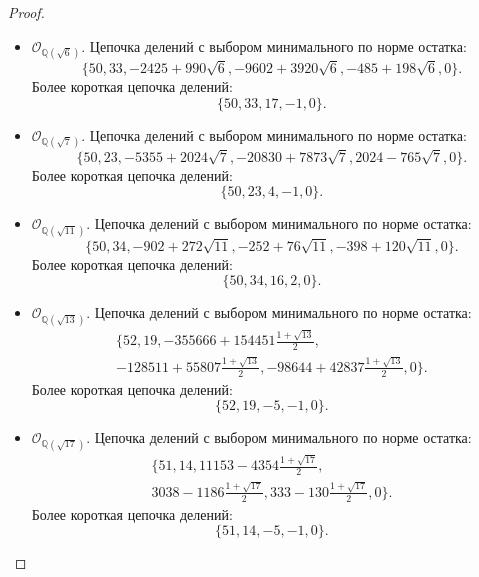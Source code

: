 \documentclass[_00_dissertation.tex]{subfiles}
\begin{document}
\begin{proof}
\begin{itemize}
        \item $\mathcal{O}_{\mathbb{Q}(\sqrt{6})}$.
        Цепочка делений с выбором минимального по норме остатка:
        \begin{equation*}
            \{50, 33, -2425+990\sqrt{6}, -9602+3920\sqrt{6}, -485+198\sqrt{6}, 0\}.
        \end{equation*}
        Более короткая цепочка делений:
        \begin{equation*}
            \{50, 33, 17, -1, 0\}.
        \end{equation*}
    
        \item $\mathcal{O}_{\mathbb{Q}(\sqrt{7})}$.
        Цепочка делений с выбором минимального по норме остатка:
        \begin{equation*}
            \{50, 23, -5355+2024\sqrt{7}, -20830+7873\sqrt{7}, 2024-765\sqrt{7}, 0\}.
        \end{equation*}
        Более короткая цепочка делений:
        \begin{equation*}
            \{50, 23, 4, -1, 0\}.
        \end{equation*}
    
        \item $\mathcal{O}_{\mathbb{Q}(\sqrt{11})}$.
        Цепочка делений с выбором минимального по норме остатка:
        \begin{equation*}
            \{50, 34, -902+272\sqrt{11}, -252+76\sqrt{11}, -398+120\sqrt{11}, 0\}.
        \end{equation*}
        Более короткая цепочка делений:
        \begin{equation*}
            \{50, 34, 16, 2, 0\}.
        \end{equation*}
    
        \item $\mathcal{O}_{\mathbb{Q}(\sqrt{13})}$.
        Цепочка делений с выбором минимального по норме остатка:
        \begin{multline*}
            \{52, 19, -355666+154451\frac{1+\sqrt{13}}{2},\\
            -128511+55807\frac{1+\sqrt{13}}{2}, -98644+42837\frac{1+\sqrt{13}}{2}, 0\}.
        \end{multline*}
        Более короткая цепочка делений:
        \begin{equation*}
            \{52, 19, -5, -1, 0\}.
        \end{equation*}
    
        \item $\mathcal{O}_{\mathbb{Q}(\sqrt{17})}$.
        Цепочка делений с выбором минимального по норме остатка:
        \begin{multline*}
            \{51, 14, 11153-4354\frac{1+\sqrt{17}}{2},\\
            3038-1186\frac{1+\sqrt{17}}{2}, 333-130\frac{1+\sqrt{17}}{2}, 0\}.
        \end{multline*}
        Более короткая цепочка делений:
        \begin{equation*}
            \{51, 14, -5, -1, 0\}.
        \end{equation*}
    

\end{itemize}
\end{proof}
\end{document}

